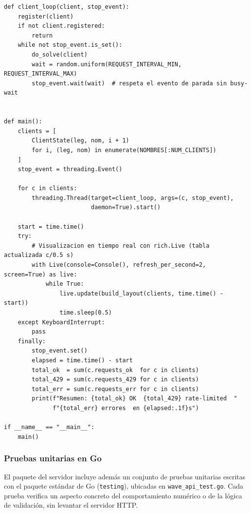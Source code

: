 \documentclass[12pt, a4paper]{article}
\begin{document}
\begin{lstlisting}[style=python, caption={Ejecución concurrente y resumen de la prueba de carga}]
def client_loop(client, stop_event):
    register(client)
    if not client.registered:
        return
    while not stop_event.is_set():
        do_solve(client)
        wait = random.uniform(REQUEST_INTERVAL_MIN, REQUEST_INTERVAL_MAX)
        stop_event.wait(wait)  # respeta el evento de parada sin busy-wait


def main():
    clients = [
        ClientState(leg, nom, i + 1)
        for i, (leg, nom) in enumerate(NOMBRES[:NUM_CLIENTS])
    ]
    stop_event = threading.Event()

    for c in clients:
        threading.Thread(target=client_loop, args=(c, stop_event),
                         daemon=True).start()

    start = time.time()
    try:
        # Visualizacion en tiempo real con rich.Live (tabla actualizada c/0.5 s)
        with Live(console=Console(), refresh_per_second=2, screen=True) as live:
            while True:
                live.update(build_layout(clients, time.time() - start))
                time.sleep(0.5)
    except KeyboardInterrupt:
        pass
    finally:
        stop_event.set()
        elapsed = time.time() - start
        total_ok  = sum(c.requests_ok  for c in clients)
        total_429 = sum(c.requests_429 for c in clients)
        total_err = sum(c.requests_err for c in clients)
        print(f"Resumen: {total_ok} OK  {total_429} rate-limited  "
              f"{total_err} errores  en {elapsed:.1f}s")

if __name__ == "__main__":
    main()
\end{lstlisting}

\subsubsection*{Pruebas unitarias en Go}

El paquete del servidor incluye además un conjunto de pruebas unitarias escritas con el
paquete estándar de Go (\texttt{testing}), ubicadas en
\texttt{wave\_api\_test.go}. Cada prueba verifica un aspecto concreto del comportamiento
numérico o de la lógica de validación, sin levantar el servidor HTTP.
\end{document}

